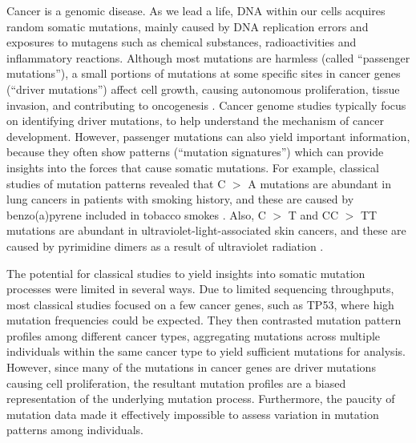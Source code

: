 \documentclass[10pt,letterpaper]{article}
\begin{document}
Cancer is a genomic disease. 
As we lead a life, DNA within our cells acquires random somatic mutations,
mainly caused by DNA replication errors and exposures to mutagens such as chemical substances, radioactivities and inflammatory reactions.  
Although most mutations are harmless (called ``passenger mutations''), 
a small portions of mutations at some specific sites in cancer genes (``driver mutations'') 
affect cell growth,
causing autonomous proliferation, tissue invasion, and contributing to oncogenesis \cite{stratton2009cancer}.
Cancer genome studies typically focus on identifying driver mutations, 
to help understand the mechanism of cancer development.
However, passenger mutations can also yield important information, 
because they often show patterns (``mutation signatures'') which 
can provide insights into the forces that cause somatic mutations.
For example, classical studies of mutation patterns
revealed that C $>$ A mutations are abundant in lung cancers in patients with smoking history,
and these are caused by benzo(a)pyrene included in tobacco smokes \cite{pmid12379884}.
Also, C $>$ T and CC $>$ TT  mutations are abundant in ultraviolet-light-associated skin cancers, 
and these are caused by pyrimidine dimers as a result of ultraviolet radiation \cite{pmid15748635}. 

The potential for classical studies to yield insights into somatic mutation processes
were limited in several ways.
Due to limited sequencing throughputs, most classical studies 
focused on a few cancer genes, such as TP53,
where high mutation frequencies could be expected. They then
contrasted mutation pattern profiles among different cancer types,
aggregating mutations across multiple individuals within the same cancer type to
yield sufficient mutations for analysis.
However, since many of the mutations in cancer genes are driver mutations causing cell proliferation,
the resultant mutation profiles are a biased representation of the underlying mutation process.
Furthermore, the paucity of mutation data made it effectively impossible to assess variation in mutation patterns among individuals.
\end{document}
